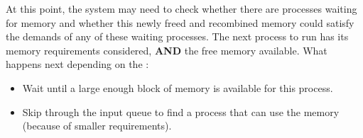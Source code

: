 At this point, the system may need to check whether there are processes waiting for memory and whether this newly freed and recombined memory could satisfy the demands of any of these waiting processes.
The next process to run has its memory requirements considered, \textbf{AND} the free memory available.
What happens next depending on the :
\begin{itemize}[noitemsep]
\item Wait until a large enough block of memory is available for this process.
\item Skip through the input queue to find a process that can use the memory (because of smaller requirements).
\end{itemize}


